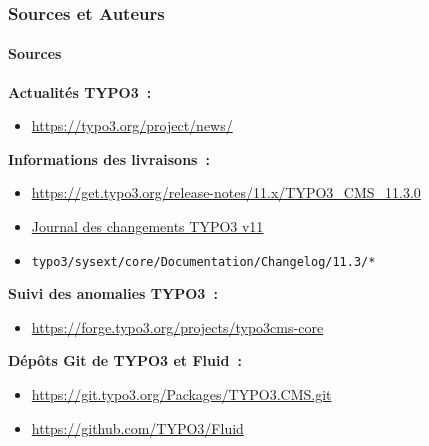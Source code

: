 %

\begin{frame}[fragile]
	\frametitle{Sources et Auteurs}
	\framesubtitle{Sources}

	\textbf{Actualités TYPO3~:}
		\begin{itemize}\smaller
			\item \url{https://typo3.org/project/news/}
		\end{itemize}

	\textbf{Informations des livraisons~:}
		\begin{itemize}\smaller
			\item \url{https://get.typo3.org/release-notes/11.x/TYPO3_CMS_11.3.0}
			\item \href{https://docs.typo3.org/c/typo3/cms-core/master/en-us/Changelog-11.html}{Journal des changements TYPO3 v11}
			\item \texttt{typo3/sysext/core/Documentation/Changelog/11.3/*}
		\end{itemize}

	\textbf{Suivi des anomalies TYPO3~:}
		\begin{itemize}\smaller
			\item \url{https://forge.typo3.org/projects/typo3cms-core}
		\end{itemize}

	\textbf{Dépôts Git de TYPO3 et Fluid~:}
		\begin{itemize}\smaller
			\item \url{https://git.typo3.org/Packages/TYPO3.CMS.git}
			\item \url{https://github.com/TYPO3/Fluid}
		\end{itemize}

\end{frame}

